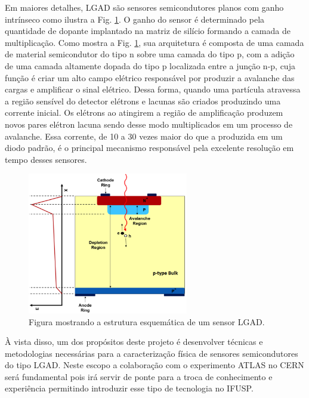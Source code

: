 Em maiores detalhes, LGAD são sensores semicondutores planos com ganho intrínseco como ilustra a Fig. \ref{lgad}. O ganho do sensor é determinado pela quantidade de dopante implantado na matriz de silício formando a camada de multiplicação. Como mostra a Fig. \ref{lgad}, sua arquitetura é composta de uma camada de material semicondutor do tipo n sobre uma camada do tipo p, com a adição de uma camada altamente dopada do tipo p localizada entre a junção n-p, cuja função é criar um alto campo elétrico responsável por produzir a avalanche das cargas e amplificar o sinal elétrico. Dessa forma, quando uma partícula atravessa a região sensível do detector  elétrons e lacunas são criados produzindo uma corrente inicial. Os elétrons ao atingirem a região de amplificação produzem novos pares elétron lacuna sendo desse modo multiplicados em um processo de avalanche. Essa corrente, de 10 a 30 vezes maior do que a produzida em um diodo padrão, é o principal mecanismo responsável pela excelente resolução em tempo desses sensores. 

\begin{figure}
    \centering
    \includegraphics[width=7.0cm]{assets/lgad.png}
    \caption{Figura mostrando a estrutura esquemática de um sensor LGAD.}
    \label{lgad}
\end{figure}

À vista disso, um dos propósitos deste projeto é desenvolver técnicas e metodologias necessárias para a caracterização física de sensores semicondutores do tipo LGAD. Neste escopo a colaboração com o experimento ATLAS no CERN será fundamental pois irá servir de ponte para a troca de conhecimento e experiência permitindo introduzir esse tipo de tecnologia no IFUSP.


